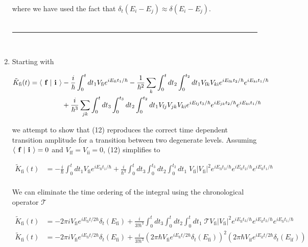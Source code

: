 \documentclass[]{article}
\begin{document}
\begin{enumerate}[1)]
where we have used the fact that $\delta_t( E_i - E_j) \approx \delta( E_i - E_j)$. \\

\hfill \\
\noindent\rule{15cm}{0.4pt} \\

\item Starting with

\begin{equation}
\begin{split}
\tilde{K}_\text{fi}(t) = \braket{\textbf{ f }}{\textbf{ i }} & - \frac{i}{\hbar} \int_{0}^{t} d t_1 V_\text{fi} e^{i E_\text{fi} t_1 /\hbar}  - \frac{1}{\hbar^2} \sum_k \int_0^t dt_2 \int_0^{t_2} dt_1 V_{\text{f} k} V_{k \text{i} } e^{ i E_{\text{f} k} t_2/\hbar}  e^{ i E_{k \text{i} } t_1/\hbar} \\
& + \frac{i}{\hbar^3} \sum_{jk} \int_0^t dt_3 \int_0^{t_3} dt_2 \int_0^{t_2} dt_1 V_{\text{f}j} V_{jk} V_{k \text{i}} e^{ i E_{\text{f} j} t_3/\hbar} e^{ i E_{j k } t_2/\hbar} e^{ i E_{k \text{i} } t_1/\hbar} \\
\end{split}
\end{equation}

we attempt to show that (12) reproduces the correct time dependent transition amplitude for a transition between two degenerate levels. Assuming $ \braket{\textbf{ f }}{\textbf{ i }}= 0$ and $V_\text{ff} = V_\text{ii} = 0$, (12) simplifies to

\begin{equation}
\begin{split}
\tilde{K}_\text{fi}(t) & =  - \frac{i}{\hbar} \int_{0}^{t} d t_1 V_\text{fi} e^{i E_\text{fi} t_1 /\hbar}    + \frac{i}{\hbar^3}  \int_0^t dt_3 \int_0^{t_3} dt_2 \int_0^{t_2} dt_1 \; V_\text{fi} |V_\text{fi}|^2 e^{ i E_{\text{fi}} t_3/\hbar} e^{ i E_\text{if} t_2/\hbar} e^{ i E_{ \text{fi} } t_1/\hbar} \\
\end{split}
\end{equation}

We can eliminate the time ordering of the integral using the chronological operator $\mathscr{T}$

\begin{equation}
\begin{split}
\tilde{K}_\text{fi}(t) & = -2\pi i V_\text{fi} e^{i E_\text{fi} t /2\hbar}  \delta_t(E_\text{fi}) + \frac{i}{3! \hbar^3} \int_0^t dt_3 \int_0^{t} dt_2 \int_0^{t} dt_1 \;  \mathscr{T}  V_\text{fi} |V_\text{fi}|^2e^{ i E_{\text{fi}} t_3/\hbar} e^{ i E_\text{if} t_2/\hbar} e^{ i E_{ \text{fi} } t_1/\hbar} \\
%
\tilde{K}_\text{fi}(t) & = -2\pi i V_\text{fi} e^{i E_\text{fi} t /2\hbar}  \delta_t(E_\text{fi}) + \frac{i}{3! \hbar^3} \left( 2 \pi \hbar V_\text{fi} e^{i E_\text{fi} t/2\hbar } \delta_t(E_\text{fi} )  \right)^2 \left( 2 \pi \hbar V_\text{if} e^{i E_\text{if} t/2\hbar } \delta_t(E_\text{if} ) \right) \\
\end{split}
\end{equation}


\end{enumerate}
\end{document}
